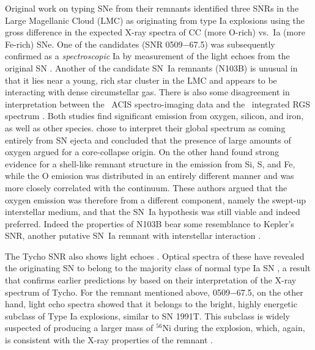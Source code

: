 \documentclass[11pt,a4paper]{article}
\begin{document}
Original work on typing SNe from their remnants \citep{hughes95}
identified three SNRs in the Large Magellanic Cloud (LMC) as
originating from type Ia explosions using the gross difference in the
expected X-ray spectra of CC (more O-rich) vs.\ Ia (more Fe-rich) SNe.
One of the candidates (SNR 0509$-$67.5) was subsequently confirmed as
a {\it spectroscopic} Ia by measurement of the light echoes from the
original SN \citep{rest08a}.  Another of the candidate SN~Ia remnants
(N103B) is unusual in that it lies near a young, rich star cluster in
the LMC and appears to be interacting with dense circumstellar
gas. There is also some disagreement in interpretation between the
\chandra\ ACIS spectro-imaging data \citep{lewis03} and the
\xmm\ integrated RGS spectrum \citep{vanderheyden02}.  Both studies
find significant emission from oxygen, silicon, and iron, as well as
other species.  \citet{vanderheyden02} chose to interpret their global
spectrum as coming entirely from SN ejecta and concluded that the
presence of large amounts of oxygen argued for a core-collapse origin.
On the other hand \citet{lewis03} found strong evidence for a
shell-like remnant structure in the emission from Si, S, and Fe, while
the O emission was distributed in an entirely different manner and was
more closely correlated with the continuum.  These authors argued that
the oxygen emission was therefore from a different component, namely
the swept-up interstellar medium, and that the SN~Ia hypothesis was
still viable and indeed preferred. Indeed the properties of N103B bear
some resemblance to Kepler's SNR, another putative SN~Ia remnant with
interstellar interaction \citep{reynolds07}.

The Tycho SNR also shows light echoes \citep{rest08b}.  Optical
spectra of these have revealed the originating SN to belong to the
majority class of normal type Ia SN \citep{krause08b}, a result that
confirms earlier predictions by \citet{badenes06} based on their
interpretation of the X-ray spectrum of Tycho.  For the remnant
mentioned above, 0509$-$67.5, on the other hand, light echo spectra
showed that it belongs to the bright, highly energetic subclass of
Type Ia explosions, similar to SN 1991T.  This subclass is widely
suspected of producing a larger mass of $^{56}$Ni during the
explosion, which, again, is consistent with the X-ray properties of
the remnant \citep{badenes08a}.
\end{document}
